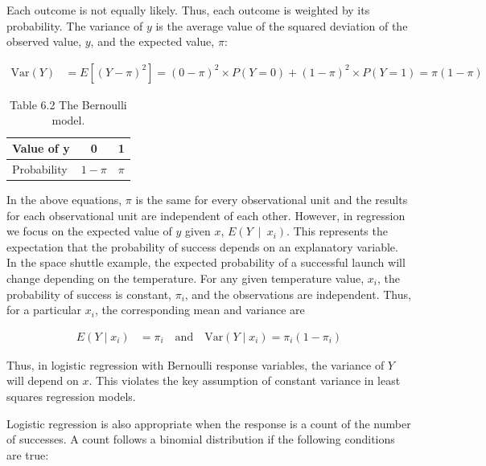 \documentclass[
]{report}
\begin{document}
Each outcome is not equally likely. Thus, each outcome is weighted by its probability. The variance of \(\scriptstyle y\) is the average value of the squared deviation of the observed value, \(\scriptstyle y\), and the expected value, \(\scriptstyle \pi\):

\begin{align}
\mathrm{Var}(Y) &= E[(Y - \pi)^2] = (0 - \pi)^2 \times P(Y = 0) + (1 - \pi)^2 \times P(Y = 1) = \pi (1 - \pi) \tag{6.19}
\end{align}

\begin{table}[!h]
\centering
\caption{\label{tab:tab62}Table 6.2 The Bernoulli model.}
\centering
\begin{tabular}[t]{lcc}
\toprule
Value of y & 0 & 1\\
\midrule
Probability & $1 - \pi$ & $\pi$\\
\bottomrule
\end{tabular}
\end{table}

In the above equations, \(\scriptstyle \pi\) is the same for every observational unit and the results for each observational unit are independent of each other. However, in regression we focus on the expected value of \(\scriptstyle y\) given \(\scriptstyle x\), \(\scriptstyle E(Y \ \mid \ x_i)\). This represents the expectation that the probability of success depends on an explanatory variable. In the space shuttle example, the expected probability of a successful launch will change depending on the temperature. For any given temperature value, \(\scriptstyle x_i\), the probability of success is constant, \(\scriptstyle \pi_i\), and the observations are independent. Thus, for a particular \(\scriptstyle x_i\), the corresponding mean and variance are

\begin{align}
E(Y \mid x_i) &= \pi_i \quad \text{and} \quad \mathrm{Var}(Y \mid x_i) = \pi_i (1 - \pi_i) 
\tag{6.20}
\end{align}

Thus, in logistic regression with Bernoulli response variables, the variance of \(\scriptstyle Y\) will depend on \(\scriptstyle x\). This violates
the key assumption of constant variance in least squares regression models.

Logistic regression is also appropriate when the response is a count of the number of successes. A count follows a binomial distribution if the following conditions are true:
\end{document}
